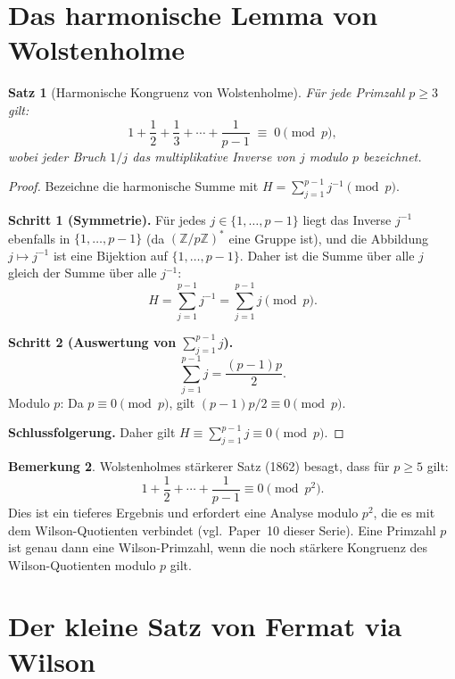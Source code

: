\documentclass[12pt,a4paper]{amsart}
\newtheorem{theorem}{Satz}[section]
\theoremstyle{definition}
\newtheorem{bemerkung}[theorem]{Bemerkung}
\newcommand{\Z}{\mathbb{Z}}
\begin{document}
\section{Das harmonische Lemma von Wolstenholme}

\begin{theorem}[Harmonische Kongruenz von Wolstenholme]\label{satz:harmonisch}
  Für jede Primzahl $p \geq 3$ gilt:
  \[
    1 + \frac{1}{2} + \frac{1}{3} + \cdots + \frac{1}{p-1}
    \;\equiv\; 0 \pmod{p},
  \]
  wobei jeder Bruch $1/j$ das multiplikative Inverse von $j$ modulo $p$ bezeichnet.
\end{theorem}

\begin{proof}
  Bezeichne die harmonische Summe mit $H = \sum_{j=1}^{p-1} j^{-1} \pmod{p}$.

  \textbf{Schritt 1 (Symmetrie).}
  Für jedes $j \in \{1, \ldots, p-1\}$ liegt das Inverse $j^{-1}$ ebenfalls
  in $\{1, \ldots, p-1\}$ (da $(\Z/p\Z)^*$ eine Gruppe ist), und die Abbildung
  $j \mapsto j^{-1}$ ist eine Bijektion auf $\{1, \ldots, p-1\}$.
  Daher ist die Summe über alle $j$ gleich der Summe über alle $j^{-1}$:
  \[
    H = \sum_{j=1}^{p-1} j^{-1} = \sum_{j=1}^{p-1} j \pmod{p}.
  \]

  \textbf{Schritt 2 (Auswertung von $\sum_{j=1}^{p-1} j$).}
  \[
    \sum_{j=1}^{p-1} j = \frac{(p-1)p}{2}.
  \]
  Modulo $p$: Da $p \equiv 0 \pmod{p}$, gilt $(p-1)p/2 \equiv 0 \pmod{p}$.

  \textbf{Schlussfolgerung.}
  Daher gilt $H \equiv \sum_{j=1}^{p-1} j \equiv 0 \pmod{p}$. \qedhere
\end{proof}

\begin{bemerkung}
  Wolstenholmes stärkerer Satz (1862) besagt, dass für $p \geq 5$ gilt:
  \[
    1 + \frac{1}{2} + \cdots + \frac{1}{p-1} \equiv 0 \pmod{p^2}.
  \]
  Dies ist ein tieferes Ergebnis und erfordert eine Analyse modulo $p^2$,
  die es mit dem Wilson-Quotienten verbindet (vgl.\ Paper~10 dieser Serie).
  Eine Primzahl $p$ ist genau dann eine Wilson-Primzahl, wenn die noch
  stärkere Kongruenz des Wilson-Quotienten modulo $p$ gilt.
\end{bemerkung}

\section{Der kleine Satz von Fermat via Wilson}
\end{document}
